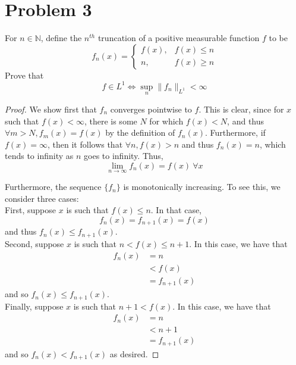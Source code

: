 \documentclass[fontsize=11pt]{scrartcl} %
\numberwithin{equation}{section} %
\numberwithin{figure}{section} %
\numberwithin{table}{section} %
\newcommand{\N}{\mathbb{N}}
\begin{document}
\newpage

\section*{Problem 3}
For $n\in\N$, define the $n^{th}$ truncation of a positive measurable function
$f$ to be
\[
    f_n(x) = \begin{cases}
        f(x), &f(x)\leq n\\
        n, &f(x)\geq n
    \end{cases}
\]
Prove that 
\[
    f\in L^1 \iff \sup_n \|f_n\|_{L^1} < \infty
\]

\begin{proof}
We show first that $f_n$ converges pointwise to $f$. This is clear, since
    for $x$ such that $f(x)<\infty$, there is some $N$ for which $f(x)<N$, and
    thus $\forall m>N, f_m(x) = f(x)$ by the definition of $f_n(x)$.
    Furthermore, if $f(x)=\infty$, then it follows that $\forall n, f(x)>n$ and
    thus $f_n(x) = n$, which tends to infinity as $n$ goes to infinity. Thus,
    \[
        \lim_{n\to\infty}f_n(x) = f(x)\ \forall x
    \]

    Furthermore, the sequence $\{f_n\}$ is monotonically increasing. To see
    this, we consider three cases:
    \\
    First, suppose $x$ is such that $f(x) \leq n$. In that case,
    \[
        f_n(x) =
        f_{n+1}(x) = f(x)
    \]
    and thus $f_n(x)\leq f_{n+1}(x)$.
    \\
    Second, suppose $x$ is such that $n<f(x)\leq n+1$. In this case, we have
    that
    \[
        \begin{aligned}
            f_n(x) &= n\\
                    &<f(x)\\
                    &=f_{n+1}(x)
        \end{aligned}
    \]
    and so $f_n(x)\leq f_{n+1}(x)$.
    \\
    Finally, suppose $x$ is such that $n+1<f(x)$. In this case, we have that
    \[
        \begin{aligned}
            f_n(x) &= n\\
                    &< n+1\\
                    &=f_{n+1}(x)
        \end{aligned}
    \]
    and so $f_n(x)<f_{n+1}(x)$ as desired.


\end{proof}
\end{document}
